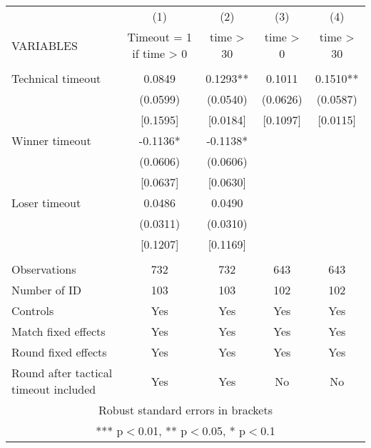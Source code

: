 \documentclass[]{article}
\begin{document}
\begin{tabular}{lcccc} \hline
 & (1) & (2) & (3) & (4) \\
VARIABLES & Timeout = 1 if time > 0 & time > 30 & time > 0 & time > 30 \\ \hline
 &  &  &  &  \\
Technical timeout & 0.0849 & 0.1293** & 0.1011 & 0.1510** \\
 & (0.0599) & (0.0540) & (0.0626) & (0.0587) \\
 & [0.1595] & [0.0184] & [0.1097] & [0.0115] \\
Winner timeout & -0.1136* & -0.1138* &  &  \\
 & (0.0606) & (0.0606) &  &  \\
 & [0.0637] & [0.0630] &  &  \\
Loser timeout & 0.0486 & 0.0490 &  &  \\
 & (0.0311) & (0.0310) &  &  \\
 & [0.1207] & [0.1169] &  &  \\
 &  &  &  &  \\
Observations & 732 & 732 & 643 & 643 \\
Number of ID & 103 & 103 & 102 & 102 \\
Controls & Yes & Yes & Yes & Yes \\
Match fixed effects & Yes & Yes & Yes & Yes \\
Round fixed effects & Yes & Yes & Yes & Yes \\
 Round after tactical timeout included & Yes & Yes & No & No \\ \hline
\multicolumn{5}{c}{ Robust standard errors in brackets} \\
\multicolumn{5}{c}{ *** p$<$0.01, ** p$<$0.05, * p$<$0.1} \\
\end{tabular}
\end{document}
